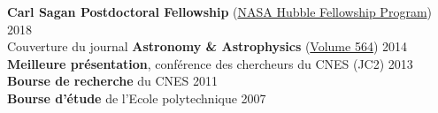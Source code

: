 \documentclass[11pt,a4paper, french]{article}
\begin{document}
\textbf{Carl Sagan Postdoctoral Fellowship} (\href{http://www.stsci.edu/stsci-research/fellowships/nasa-hubble-fellowship-program}{NASA Hubble Fellowship Program}) \hfill   2018\\

\vspace{-0.15cm}
Couverture du journal \textbf{Astronomy \& Astrophysics} (\href{https://www.aanda.org/articles/aa/abs/2014/04/contents/contents.html}{Volume 564}) \hfill  2014\\

\vspace{-0.15cm}
\textbf{Meilleure présentation}, conférence des chercheurs du CNES (JC2) \hfill   2013\\

\vspace{-0.15cm}
\textbf{Bourse de recherche} du CNES \hfill   2011\\

\vspace{-0.15cm}
\textbf{Bourse d'étude} de l'Ecole polytechnique \hfill   2007\\

\end{document}
